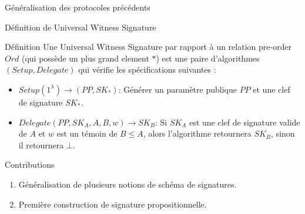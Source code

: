 \begin{frame}{G\'en\'eralisation des protocoles pr\'ec\'edents}
  \begin{figure}
  \end{figure}
\end{frame}





\begin{frame}{D\'efinition de Universal Witness Signature}
  \begin{block}{D\'efinition}
    Une Universal Witness Signature par rapport \`a un relation pre-order $Ord$ (qui poss\`ede un plus grand element $*$) est une paire d'algorithmes $(Setup, Delegate)$ qui v\'erifie les sp\'ecifications suivantes :
    \begin{itemize}
    \item $Setup(1^\lambda) \to (PP,SK_*)$: G\'en\'erer un param\`etre publique $PP$ et une clef de signature $SK_*$.
    \item $Delegate(PP, SK_A, A, B, w) \to SK_B$: Si $SK_A$ est une clef de signature valide de $A$ et $w$ est un t\'emoin de $B\leq A$, alors l'algorithme retournera $SK_B$, sinon il retournera $\bot$.
    \end{itemize}
  \end{block}
\end{frame}




\begin{frame}{Contributions}
  \begin{enumerate}
  \item G\'en\'eralisation de plusieurs notions de sch\'ema de signatures.
  \item Premi\`ere construction de signature propositionnelle.
  \end{enumerate}

\end{frame}